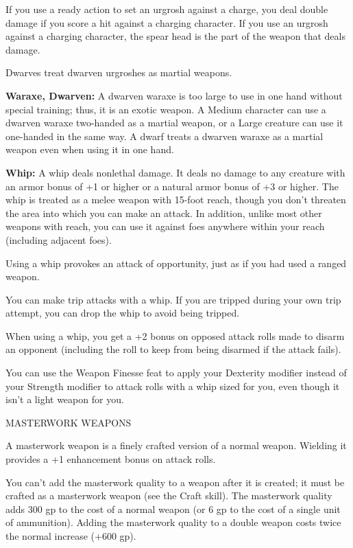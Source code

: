 \documentclass{article}
\begin{document}
If you use a ready action to set an urgrosh against a charge, you deal double damage 
if you score a hit against a charging character. If you use an urgrosh against 
a charging character, the spear head is the part of the weapon that deals damage.

Dwarves treat dwarven urgroshes as martial weapons.

\textbf{Waraxe, Dwarven: }A dwarven waraxe is too large to use in one hand without 
special training; thus, it is an exotic weapon. A Medium character can use a dwarven 
waraxe two-handed as a martial weapon, or a Large creature can use it one-handed 
in the same way. A dwarf treats a dwarven waraxe as a martial weapon even when 
using it in one hand.

\textbf{Whip:} A whip deals nonlethal damage. It deals no damage to any creature 
with an armor bonus of +1 or higher or a natural armor bonus of +3 or higher. The 
whip is treated as a melee weapon with 15-foot reach, though you don't threaten 
the area into which you can make an attack. In addition, unlike most other weapons 
with reach, you can use it against foes anywhere within your reach (including adjacent 
foes).

Using a whip provokes an attack of opportunity, just as if you had used a ranged 
weapon.

You can make trip attacks with a whip. If you are tripped during your own trip 
attempt, you can drop the whip to avoid being tripped.

When using a whip, you get a +2 bonus on opposed attack rolls made to disarm an 
opponent (including the roll to keep from being disarmed if the attack fails).

You can use the Weapon Finesse feat to apply your Dexterity modifier instead of 
your Strength modifier to attack rolls with a whip sized for you, even though it 
isn't a light weapon for you.

\vspace{12pt}
MASTERWORK WEAPONS

A masterwork weapon is a finely crafted version of a normal weapon. Wielding it 
provides a +1 enhancement bonus on attack rolls.

You can't add the masterwork quality to a weapon after it is created; it must be 
crafted as a masterwork weapon (see the Craft skill). The masterwork quality adds 
300 gp to the cost of a normal weapon (or 6 gp to the cost of a single unit of 
ammunition). Adding the masterwork quality to a double weapon costs twice the normal 
increase (+600 gp).
\end{document}
